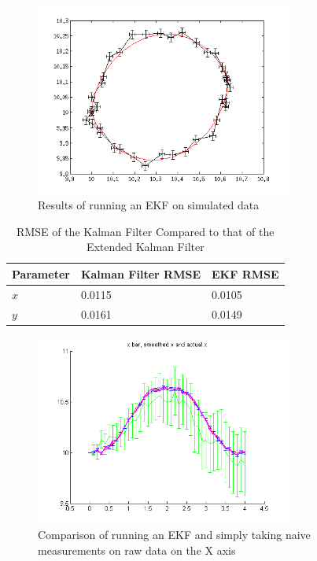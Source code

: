 \documentclass[english]{article}
\begin{document}
\begin{figure}[htp]
\centering
 \includegraphics[width=0.75\textwidth]{images/ExtendedKalman.png}
\caption{Results of running an EKF on simulated data}
\label{fig:rekf}
\end{figure}

\begin{table}[htp]
\begin{center}
\begin{tabular}{|l|l|l|}
\hline
\textbf{Parameter} & \textbf{Kalman Filter RMSE} & \textbf{EKF RMSE} \\
\hline
$x$ & 0.0115 & 0.0105 \\
$y$ & 0.0161 & 0.0149 \\
\hline
\end{tabular}
\end{center}
\caption{RMSE of the Kalman Filter Compared to that of the Extended Kalman Filter}
\label{tbl:rkalman}
\end{table}

\begin{figure}[htp]
\centering
 \includegraphics[width=0.75\textwidth]{images/xxbar.png}
\caption{Comparison of running an EKF and simply taking naive measurements on raw data on the X axis}
\label{fig:xxbar}
\end{figure}
\end{document}
